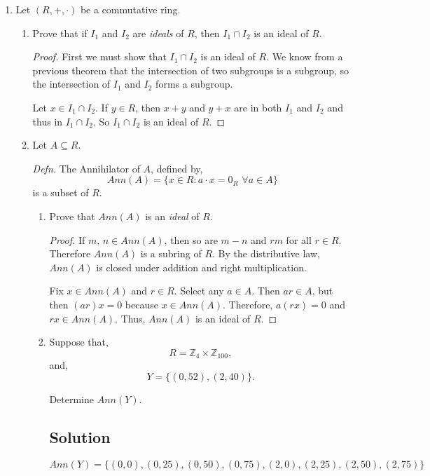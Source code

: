 \documentclass[12pt]{amsart}
\begin{document}
\begin{enumerate}
\begin{enumerate}
\end{enumerate}

\item Let $(R, +, \cdot)$ be a commutative ring.

\bigskip

\begin{enumerate}\setlength{\itemsep}{6pt}
\item Prove that if $I_1$ and $I_2$ are {\it ideals} of $R$, then $I_1 \cap I_2$ is an ideal of $R$.

\begin{proof}
First we must show that $I_1 \cap I_2$ is an ideal of $R$. We know from a previous theorem that the intersection of two subgroups is a subgroup, so the intersection of $I_1$ and $I_2$ forms a subgroup.

Let $x \in I_1 \cap I_2$. If $y \in R$, then $x+y$ and $y+x$ are in both $I_1$ and $I_2$ and thus in $I_1 \cap I_2$. So $I_1 \cap I_2$ is an ideal of $R$.
\end{proof}

\item Let $A \subseteq R$.

\bigskip

{\it Defn.} The Annihilator of $A$, defined by,
%
\[ Ann(A) = \{ x\in R : a\cdot x = 0_R\,\, \forall a \in A \} \]
%
is a subset of $R$.

\bigskip

\begin{enumerate}\setlength{\itemsep}{6pt}
\item Prove that $Ann(A)$ is an {\it ideal} of $R$.

\begin{proof}
If $m,\,n\in Ann(A)$, then so are $m-n$ and $rm$ for all $r\in R$. Therefore $Ann(A)$ is a subring of $R$. By the distributive law, $Ann(A)$ is closed under addition and right multiplication.

Fix $x\in Ann(A)$ and $r \in R$. Select any $a \in A$. Then $ar \in A$, but then $(ar)x = 0$ because $x\in Ann(A)$. Therefore, $a(rx) = 0$ and $rx \in Ann(A)$. Thus, $Ann(A)$ is an ideal of $R$.
\end{proof}

\item Suppose that,
%
\[ R = \mathbb Z_4 \times \mathbb Z_{100},\]
%
and,
%
\[ Y = \{ (0,52), (2,40) \}. \]

Determine $Ann(Y)$.

\subsection*{Solution}
%
\[ Ann(Y) = \{ (0,0), (0,25), (0,50), (0,75), (2,0), (2,25), (2,50), (2,75) \} \]
%


\end{enumerate}
\end{enumerate}
\end{enumerate}
\end{document}
